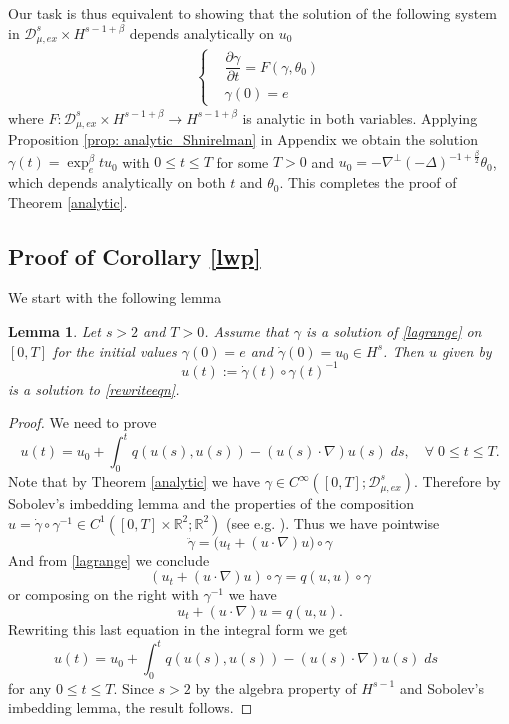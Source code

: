\documentclass[11pt]{amsart}
\numberwithin{equation}{section}
\newtheorem{lemma}[theorem]{Lemma}
\begin{document}
		
		Our task is thus equivalent to showing that the solution of the following system in $\mathcal{D}_{\mu,ex}^s\times H^{s-1+\beta}$ depends analytically on $u_0$
		\begin{align}\label{e:gammaODE}
        	\begin{cases}
		&\dfrac{\partial \gamma}{\partial t}=F(\gamma,\theta_0)\\
        & \gamma(0)=e
        \end{cases}
		\end{align}
        where $F: \mathcal{D}_{\mu,ex}^s\times H^{s-1+\beta}\rightarrow  H^{s-1+\beta}$ is analytic in both variables. Applying Proposition \ref{prop: analytic_Shnirelman} in Appendix we obtain the solution $\gamma(t)=\exp_{e}^\beta tu_0$ with $0\le t\le T$ for some $T>0$ and $u_0=-\nabla^{\perp}(-\Delta)^{-1+\frac{\beta}{2}}\theta_0$, which depends analytically on both $t$ and $\theta_0$. This completes the proof of Theorem \ref{analytic}.

	\subsection{Proof of Corollary \ref{lwp}}

We start with the following lemma

\begin{lemma}\label{lemma_lagrangian_to_eulerian}
	Let $s >2$ and $T > 0$. Assume that $\gamma$ is a solution of \eqref{lagrange} on $[0,T]$ for the initial values $\gamma(0)=e$ and $ 	\dot{\gamma}(0)= u_0\in H^s$. Then $u$ given by
	\[
	u(t):=\dot{\gamma}(t) \circ \gamma(t)^{-1}
	\] 
	is a solution to \eqref{rewriteeqn}.
\end{lemma}

\begin{proof}
	We need to prove
	\[
	u(t) = u_0 + \int_0^t q(u(s),u(s)) - (u(s) \cdot \nabla) u(s) \;ds, \quad \forall \; 0 \leq t \leq T.
	\]
	Note that by Theorem \ref{analytic} we have $\gamma \in C^\infty([0,T];\mathcal{D}_{\mu, ex}^s)$. Therefore by Sobolev's imbedding lemma and the properties of the composition $u =\dot{\gamma} \circ \gamma^{-1}  \in C^1([0,T] \times \mathbb R^2;\mathbb R^2)$ (see e.g. \cite{Inci_K_T2013}).  Thus we have pointwise
	\[
	\ddot{\gamma} = \big(u_t + (u \cdot \nabla) u \big) \circ 	\gamma
	\]
	And from \eqref{lagrange} we conclude 
	\[
	(u_t + (u \cdot \nabla) u) \circ 	\gamma = q(u,u) \circ \gamma
	\]
	or composing on the right with $\gamma^{-1}$ we have
    \[u_t + (u \cdot \nabla) u = q(u,u).\]
    Rewriting this last equation in the integral form we get
	\[
	u(t) = u_0 + \int_0^t q(u(s),u(s))-(u(s) \cdot \nabla) u(s) \;ds \qquad 
	\]
	for any $ 0 \leq t \leq T$. Since $s>2$ by the algebra property of $H^{s-1}$ and Sobolev's imbedding lemma, the result follows.
\end{proof}
\end{document}
